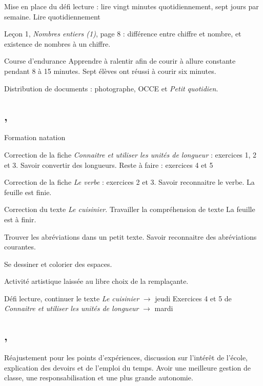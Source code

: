 \documentclass{article}
\begin{document}
\lec{} Mise en place du défi lecture : lire vingt minutes quotidiennement, sept jours par semaine.
\obj Lire quotidiennement

\gec{}

\nec{} Leçon \no{} 1, \emph{Nombres entiers (1)}, page 8 : différence entre chiffre et nombre, et existence de nombres à un chiffre.             

\eps\hpm Course d’endurance
\obj Apprendre à ralentir afin de courir à allure constante pendant 8 à 15 minutes.
\bil Sept élèves ont réussi à courir six minutes.

\adm\pmr Distribution de documents : photographe, OCCE et \emph{Petit quotidien}.


\subsection{ \sep}
\note Formation natation 

\gem\ham Correction de la fiche \emph{Connaitre et utiliser les unités de longueur} : exercices 1, 2 et 3.
\obj Savoir convertir des longueurs.
\bil Reste à faire : exercices 4 et 5

\gra\han Correction de la fiche \emph{Le verbe} : exercices 2 et 3.
\obj Savoir reconnaitre le verbe.
\bil La feuille est finie.

\lec{} Correction du texte \emph{Le cuisinier}.
\obj Travailler la compréhension de texte
\bil La feuille est à finir.

\jdl{} Trouver les abréviations dans un petit texte.
\obj Savoir reconnaitre des abréviations courantes.

\art\pmr Se dessiner et colorier des espaces.

\note Activité artistique laissée au libre choix de la remplaçante.

\dev
\lec Défi lecture, continuer le texte \textit{Le cuisinier} $\rightarrow$ jeudi
\gem Exercices 4 et 5 de \emph{Connaitre et utiliser les unités de longueur} $\rightarrow$ mardi


\subsection{ \sep}
\clc\ham Réajustement pour les points d’expériences, discussion sur l’intérêt de l’école, explication des devoirs et de l’emploi du temps.
\obj Avoir une meilleure gestion de classe, une responsabilisation et une plus grande autonomie.
\end{document}
